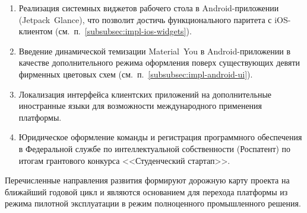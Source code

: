 \begin{enumerate}
  \item Реализация системных виджетов рабочего стола в Android-приложении (Jetpack~Glance), что позволит достичь функционального паритета с iOS-клиентом (см.~п.~\ref{subsubsec:impl-ios-widgets}).
  \item Введение динамической темизации Material~You в Android-приложении в качестве дополнительного режима оформления поверх существующих девяти фирменных цветовых схем (см.~п.~\ref{subsubsec:impl-android-ui}).
  \item Локализация интерфейса клиентских приложений на дополнительные иностранные языки для возможности международного применения платформы.
  \item Юридическое оформление команды и регистрация программного обеспечения в Федеральной службе по интеллектуальной собственности (Роспатент) по итогам грантового конкурса <<Студенческий стартап>>.
\end{enumerate}

Перечисленные направления развития формируют дорожную карту проекта на ближайший годовой цикл и являются основанием для перехода платформы из режима пилотной эксплуатации в режим полноценного промышленного решения.
